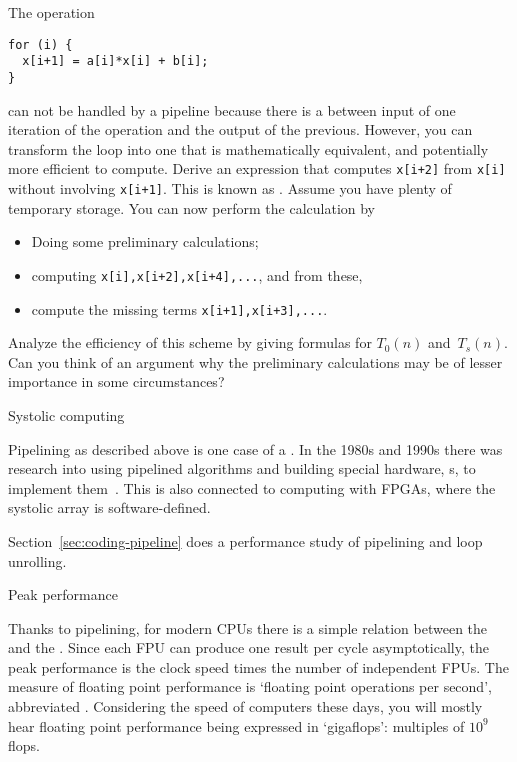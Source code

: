 \begin{exercise}
\label{ex:recursivedoubling}
  The operation
\begin{verbatim}
for (i) {
  x[i+1] = a[i]*x[i] + b[i];
}
\end{verbatim}
  can not be handled by a pipeline because there is
  a  between input of one iteration of the operation
  and the output of the previous.
  However, you can transform the loop into one that is mathematically
  equivalent, and potentially more efficient to compute. Derive an
  expression that computes \texttt{x[i+2]} from \texttt{x[i]} without
  involving \texttt{x[i+1]}. This is known as . Assume you have plenty of temporary storage. You can now
  perform the calculation by
  \begin{itemize}
  \item Doing some preliminary calculations;
  \item computing \texttt{x[i],x[i+2],x[i+4],...}, and from these,
  \item compute the missing terms \texttt{x[i+1],x[i+3],...}.
  \end{itemize}
  Analyze the efficiency of this scheme by giving formulas for
  $T_0(n)$ and~$T_s(n)$. Can you think of an argument
  why the preliminary calculations may be of lesser importance in some
  circumstances?
\end{exercise}

 {Systolic computing}

Pipelining as described above is one case of a
. In the 1980s and 1990s there was
research into using pipelined algorithms and building special
hardware, s, to implement
them~\cite{Ku:systolic}. This is also connected to computing with
\acp{FPGA}, where the systolic array is software-defined.

Section~\ref{sec:coding-pipeline} does a performance study
of pipelining and loop unrolling.


 {Peak performance}

Thanks to pipelining, for modern \acp{CPU} there is a simple relation
between the  and the .
Since each \ac{FPU} can produce one result per cycle
asymptotically, the peak performance is the clock speed times the
number of independent \acp{FPU}. The measure of floating
point performance is `floating point operations per second',
abbreviated . Considering the speed of computers
these days, you will mostly hear floating point performance being
expressed in `gigaflops': multiples of $10^9$ flops.

